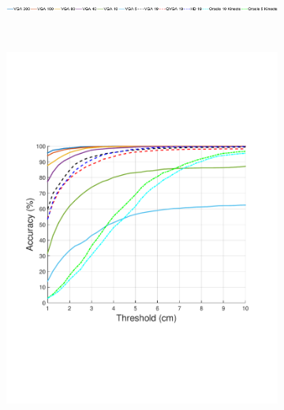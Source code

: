 \begin{figure}[t]
	\centering
	\captionsetup{position=top}
	\begin{subfigure}{\textwidth}
		\includegraphics[width=\textwidth]{figures/0822_quant_noLegend/legend}
	\end{subfigure}\\
	\begin{subfigure}{0.245\textwidth}

		\includegraphics[trim=40 180 60 		170,clip,width=\textwidth]{figures/0822_quant_noLegend/PCK-Threshold-two-people.pdf}
	\end{subfigure}
	\begin{subfigure}{0.245\textwidth}


\end{subfigure}
\end{figure}
